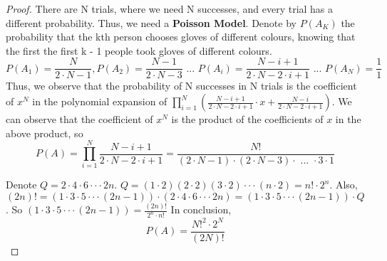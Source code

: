 \documentclass{article}
\begin{document}
\begin{proof}
There are N trials, where we need N successes, and every trial has a different probability. Thus, we need a \textbf{Poisson Model}. 
Denote by $P({A}_{K})$ the probability that the kth person chooses gloves of different colours, knowing that the first the first k - 1 people took gloves of different colours.
\[ P({A}_{1}) = \frac{N}{2 \cdot N - 1}, P({A}_{2}) = \frac{N - 1}{2 \cdot N - 3} \textit{ ... } P({A}_{i}) = \frac{N - i + 1}{2 \cdot N - 2 \cdot i + 1} \textit{ ... } P({A}_{N}) = \frac{1}{1}\]
Thus, we observe that the probability of N successes in N trials is the coefficient of ${x}^{N}$ in the polynomial expansion of $\displaystyle\prod_{i = 1}^{N} {(\frac{N - i + 1}{2 \cdot N - 2 \cdot i + 1} \cdot x + \frac{N - i}{2 \cdot N - 2 \cdot i + 1})}$. We can observe that the coefficient of ${x}^{N}$ is the product of the coefficients of $x$ in the above product, so \[ P(A) = \prod_{i = 1}^{N} {\frac{N - i + 1}{2 \cdot N - 2 \cdot i + 1}} = \frac{N!}{(2 \cdot N - 1) \cdot (2 \cdot N - 3) \cdot \textit{ ... } \cdot 3 \cdot 1} \]

Denote $Q = 2 \cdot 4 \cdot 6 \cdot \cdot \cdot 2n$. $Q = (1 \cdot 2)(2 \cdot 2)(3 \cdot 2)\cdot\cdot\cdot(n \cdot 2) = n! \cdot {2}^{n}$.
Also, $(2n)! = (1 \cdot 3 \cdot 5 \cdot\cdot\cdot (2n - 1)) \cdot (2 \cdot 4 \cdot 6 \cdot \cdot \cdot 2n) = (1 \cdot 3 \cdot 5 \cdot\cdot\cdot (2n - 1)) \cdot Q$. So $(1 \cdot 3 \cdot 5 \cdot\cdot\cdot (2n - 1)) = \frac{(2n)!}{{2}^{n} \cdot n!}$
In conclusion,
\[ P(A) = \frac{{N!}^{2}\cdot {2}^{N}}{(2N)!} \]
\end{proof}
\end{document}
